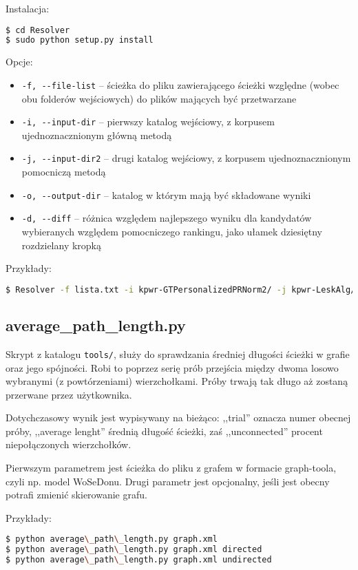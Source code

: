 \documentclass[10pt,a4paper]{article}
\begin{document}
Instalacja:
\begin{lstlisting}[language=bash]
$ cd Resolver
$ sudo python setup.py install
\end{lstlisting}

Opcje:
\begin{itemize}
	\item \texttt{-f, -{}-file-list} -- ścieżka do pliku zawierającego ścieżki względne (wobec obu folderów wejściowych) do plików mających być przetwarzane
	\item \texttt{-i, -{}-input-dir} -- pierwszy katalog wejściowy, z korpusem ujednoznacznionym główną metodą
	\item \texttt{-j, -{}-input-dir2} -- drugi katalog wejściowy, z korpusem ujednoznacznionym pomocniczą metodą
	\item \texttt{-o, -{}-output-dir} -- katalog w którym mają być składowane wyniki
	\item \texttt{-d, -{}-diff} -- różnica względem najlepszego wyniku dla kandydatów wybieranych względem pomocniczego rankingu, jako ułamek dziesiętny rozdzielany kropką
\end{itemize}

Przykłady:
\begin{lstlisting}[language=bash]
$ Resolver -f lista.txt -i kpwr-GTPersonalizedPRNorm2/ -j kpwr-LeskAlg/ -o wyniki/ -d 0.3
\end{lstlisting}


\subsection{average\_path\_length.py}
Skrypt z katalogu \texttt{tools/}, służy do sprawdzania średniej długości ścieżki w grafie oraz jego spójności. Robi to poprzez serię prób przejścia między dwoma losowo wybranymi (z powtórzeniami) wierzchołkami. Próby trwają tak długo aż zostaną przerwane przez użytkownika.

Dotychczasowy wynik jest wypisywany na bieżąco: ,,trial'' oznacza numer obecnej próby, ,,average lenght'' średnią długość ścieżki, zaś ,,unconnected'' procent niepołączonych wierzchołków.

Pierwszym parametrem jest ścieżka do pliku z grafem w formacie graph-toola, czyli np. model WoSeDonu. Drugi parametr jest opcjonalny, jeśli jest obecny potrafi zmienić skierowanie grafu.

Przykłady:
\begin{lstlisting}[language=bash]
$ python average\_path\_length.py graph.xml
$ python average\_path\_length.py graph.xml directed
$ python average\_path\_length.py graph.xml undirected
\end{lstlisting}
\end{document}
